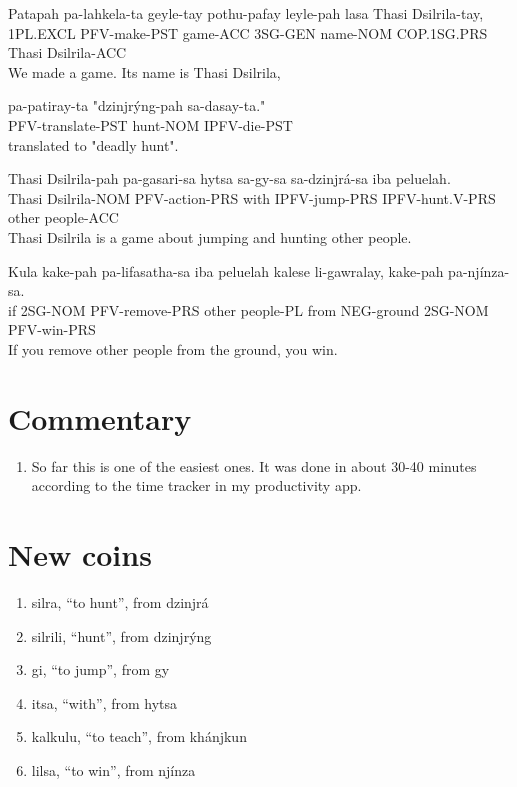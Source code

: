 \documentclass{thiguka}
\begin{document}
\begin{exe}
\ex{} \gll{}Patapah  pa-lahkela-ta geyle-tay pothu-pafay leyle-pah lasa        Thasi Dsilrila-tay,\\
            1PL.EXCL PFV-make-PST  game-ACC  3SG-GEN     name-NOM  COP.1SG.PRS Thasi Dsilrila-ACC\\
      \glt{}We made a game. Its name is Thasi Dsilrila,
\end{exe}

\begin{exe}
\ex{} \gll{}pa-patiray-ta     "dzinjrýng-pah sa-dasay-ta."\\
            PFV-translate-PST  hunt-NOM      IPFV-die-PST\\
      \glt{}translated to "deadly hunt".
\end{exe}

\begin{exe}   
\ex{} \gll{}Thasi Dsilrila-pah pa-gasari-sa   hytsa sa-gy-sa      sa-dzinjrá-sa   iba   peluelah.\\
            Thasi Dsilrila-NOM PFV-action-PRS with  IPFV-jump-PRS IPFV-hunt.V-PRS other people-ACC\\
      \glt{}Thasi Dsilrila is a game about jumping and hunting other people.
\end{exe}

\begin{exe}
\ex{} \gll{}Kula kake-pah pa-lifasatha-sa iba   peluelah  kalese li-gawralay, kake-pah pa-njínza-sa.\\
            if   2SG-NOM  PFV-remove-PRS  other people-PL from   NEG-ground  2SG-NOM  PFV-win-PRS\\
      \glt{}If you remove other people from the ground, you win.
\end{exe}

\section{Commentary}
\begin{enumerate}
    \item So far this is one of the easiest ones. It was done in about 30-40 minutes according to the time tracker in my productivity app.
\end{enumerate}

\newpage

\section{New coins}
\begin{enumerate}
    \item silra, ``to hunt'', from dzinjrá
    \item silrili, ``hunt'', from dzinjrýng
    \item gi, ``to jump'', from gy
    \item itsa, ``with'', from hytsa
    \item kalkulu, ``to teach'', from khánjkun
    \item lilsa, ``to win'', from njínza
\end{enumerate}
\end{document}
